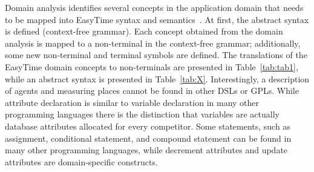 \documentclass[preprint, prX]{revtex4}
\begin{document}
Domain analysis identifies several concepts in the application domain that needs to be mapped into EasyTime syntax and
semantics~\cite{Mernik:2005}. At first, the abstract syntax is defined (context-free grammar). Each concept obtained from the domain
analysis is mapped to a non-terminal in the context-free grammar; additionally, some new non-terminal and terminal symbols are defined. The translations of the EasyTime domain concepts to non-terminals are presented in Table~\ref{tab:tab1}, while an abstract syntax is presented in Table~\ref{tab:X}. Interestingly, a description of agents and measuring places cannot be found in other DSLs or GPLs. While attribute declaration is similar to variable declaration in many other programming languages there is the distinction that variables are actually database attributes allocated for every competitor. Some statements, such as assignment, conditional statement, and compound statement can be found in many other programming languages, while decrement attributes and update attributes are domain-specific constructs.
\end{document}
